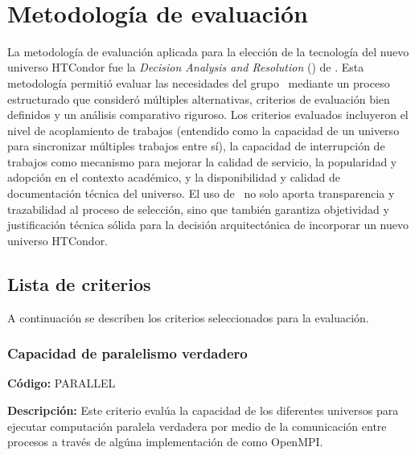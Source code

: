 \label{cap:dar}
\mbox{}\\


\section{Metodología de evaluación}

La metodología de evaluación aplicada para la elección de la tecnología del nuevo universo HTCondor fue la \textit{Decision Analysis and Resolution} (\DAR) de \CMMI \citep{CMMIInstitute2010}. Esta metodología permitió evaluar las necesidades del grupo \GRID\ mediante un proceso estructurado que consideró múltiples alternativas, criterios de evaluación bien definidos y un análisis comparativo riguroso. Los criterios evaluados incluyeron el nivel de acoplamiento de trabajos (entendido como la capacidad de un universo para sincronizar múltiples trabajos entre sí), la capacidad de interrupción de trabajos como mecanismo para mejorar la calidad de servicio, la popularidad y adopción en el contexto académico, y la disponibilidad y calidad de documentación técnica del universo. El uso de \DAR\ no solo aporta transparencia y trazabilidad al proceso de selección, sino que también garantiza objetividad y justificación técnica sólida para la decisión arquitectónica de incorporar un nuevo universo HTCondor.

\subsection{Lista de criterios}
A continuación se describen los criterios seleccionados para la evaluación.

\subsubsection{Capacidad de paralelismo verdadero}
\textbf{Código:} PARALLEL

\textbf{Descripción:} Este criterio evalúa la capacidad de los diferentes universos para ejecutar computación paralela verdadera \citep{Morgan2009} por medio de la comunicación entre procesos a través de algúna implementación de \MPI como OpenMPI.

